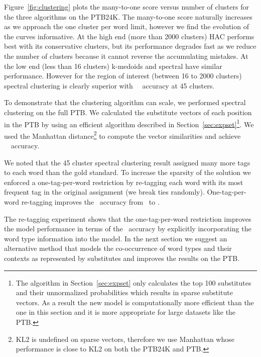 Figure~\ref{fig:clustering} plots the many-to-one score versus number
of clusters for the three algorithms on the PTB24K.  The many-to-one
score naturally increases as we approach the one cluster per word
limit, however we find the evolution of the curves informative.  At
the high end (more than 2000 clusters) HAC performs best with its
conservative clusters, but its performance degrades fast as we reduce
the number of clusters because it cannot reverse the accumulating
mistakes.  At the low end (less than 16 clusters) k-medoids and
spectral have similar performance.  However for the region of interest
(between 16 to 2000 clusters) spectral clustering is clearly superior
with \spectralResult\ \mto\ accuracy at 45 clusters.

To demonstrate that the clustering algorithm can scale, we performed
spectral clustering on the full PTB.  We calculated the substitute
vectors of each position in the PTB by using an efficient algorithm
described in Section~\ref{sec:expset}\footnote{The algorithm in
  Section~\ref{sec:expset} only calculates the top 100 substitutes and
  their unnormalized probabilities which results in sparse substitute
  vectors.  As a result the new model is computationally more
  efficient than the one in this section and it is more appropriate
  for large datasets like the PTB.}.  We used the Manhattan
distance\footnote{KL2 is undefined on sparse vectors, therefore we use
  Manhattan whose performance is close to KL2 on both the PTB24K and
  PTB.}  to compute the vector similarities and achieve
\spectralMtoPTB\ \mto\ accuracy.

We noted that the 45 cluster spectral clustering result assigned many
more tags to each word than the gold standard.  To increase the
sparsity of the solution we enforced a one-tag-per-word restriction by
re-tagging each word with its most frequent tag in the original
assignment (we break ties randomly).  One-tag-per-word re-tagging
improves the \mto\ accuracy from \spectralMtoPTB\ to \collapseMtoPTB.

The re-tagging experiment shows that the one-tag-per-word restriction
improves the model performance in terms of the \mto\ accuracy by
explicitly incorporating the word type information into the model.  In
the next section we suggest an alternative method that models the
co-occurrence of word types and their contexts as represented by
substitutes and improves the results on the PTB.




